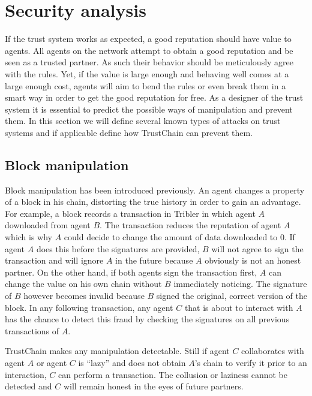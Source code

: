 \section{Security analysis}
\label{sec:attacks}
If the trust system works as expected, a good reputation should have value to agents. All agents on 
the network attempt to obtain a good reputation and be seen as a trusted partner. As such their 
behavior should be meticulously agree with the rules. Yet, if the value is large enough and behaving
well comes at a large enough cost, agents will aim to bend the rules or even break them in a smart 
way in order to get the good reputation for free. As a designer of the trust system it is essential
to predict the possible ways of manipulation and prevent them. In this section we will define several
known types of attacks on trust systems and if applicable define how TrustChain can prevent them.

\subsection{Block manipulation}
\label{sec:tampering}
Block manipulation has been introduced previously. An agent changes a property of a block in his 
chain, distorting the true history in order to gain an advantage. For example, a block records a 
transaction in Tribler in which agent $A$ downloaded from agent $B$. The transaction reduces the 
reputation of agent $A$ which is why $A$ could decide to change the amount of data downloaded to 0.
If agent $A$ does this before the signatures are provided, $B$ will not agree to sign the transaction
and will ignore $A$ in the future because $A$ obviously is not an honest partner. On the other hand,
if both agents sign the transaction first, $A$ can change the value on his own chain without $B$ 
immediately noticing. The signature of $B$ however becomes invalid because $B$ signed the original, 
correct version of the block. In any following transaction, any agent $C$ that is about to interact
with $A$ has the chance to detect this fraud by checking the signatures on all previous transactions
of $A$. 

TrustChain makes any manipulation detectable. Still if agent $C$ collaborates with agent $A$ or 
agent $C$ is ``lazy'' and does not obtain $A$'s chain to verify it prior to an interaction, $C$ can 
perform a transaction. The collusion or laziness cannot be detected and $C$ will remain honest 
in the eyes of future partners.


